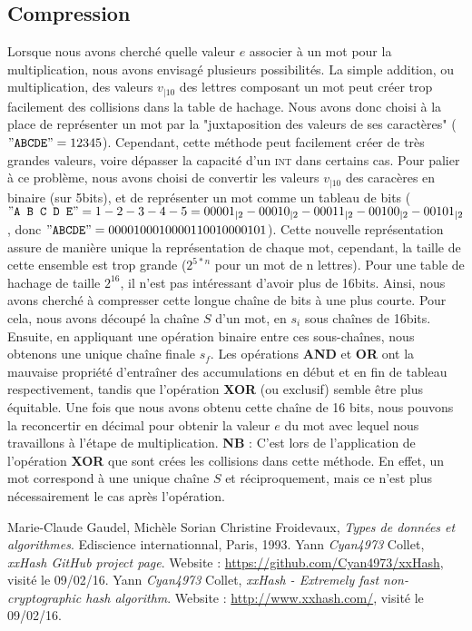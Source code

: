 \documentclass[final,twoside,article,10pt]{scrartcl}
\begin{document}
    \subsection{Compression}
    \label{sec:compression}
    Lorsque nous avons cherché quelle valeur $e$ associer à un mot pour la multiplication, nous avons envisagé plusieurs possibilités. La simple addition, ou multiplication, des valeurs $v_{|10}$ des lettres composant un mot peut créer trop facilement des collisions dans la table de hachage.
    Nous avons donc choisi à la place de représenter un mot par la "juxtaposition des valeurs de ses caractères" ($"\texttt{ABCDE}" = 12345$).
    Cependant, cette méthode peut facilement créer de très grandes valeurs, voire dépasser la capacité d'un \textsc{int} dans certains cas.
    Pour palier à ce problème, nous avons choisi de convertir les valeurs $v_{|10}$ des caracères en binaire (sur 5bits), et de représenter un mot comme un tableau de bits ($"\texttt{A B C D E}" = 1-2-3-4-5 = 00001_{|2}-00010_{|2}-00011_{|2}-00100_{|2}-00101_{|2}$, donc $"\texttt{ABCDE}" = 0000100010000110010000101$).
    Cette nouvelle représentation assure de manière unique la représentation de chaque mot, cependant, la taille de cette ensemble est trop grande ($2^{5*n}$ pour un mot de n lettres). 
    Pour une table de hachage de taille $2^{16}$, il n'est pas intéressant d'avoir plus de 16bits.
    Ainsi, nous avons cherché à compresser cette longue chaîne de bits à une plus courte.
    Pour cela, nous avons découpé la chaîne $S$ d'un mot, en $s_i$ sous chaînes de 16bits. Ensuite, en appliquant une opération binaire entre ces sous-chaînes, nous obtenons une unique chaîne finale $s_f$.
    Les opérations \textbf{AND} et \textbf{OR} ont la mauvaise propriété d'entraîner des accumulations en début et en fin de tableau respectivement, tandis que l'opération \textbf{XOR} (ou exclusif) semble être plus équitable.
    Une fois que nous avons obtenu cette chaîne de 16 bits, nous pouvons la reconcertir en décimal pour obtenir la valeur $e$ du mot avec lequel nous travaillons à l'étape de multiplication.\newline
    \medskip\newline
    \textbf{NB} : C'est lors de l'application de l'opération \textbf{XOR} que sont crées les collisions dans cette méthode. En effet, un mot correspond à une unique chaîne $S$ et réciproquement, mais ce n'est plus nécessairement le cas après l'opération.
    \begin{thebibliography}{9}
        Marie-Claude Gaudel, Michèle Sorian Christine Froidevaux, \emph{Types de données et algorithmes}. Ediscience internationnal, Paris, 1993.
        Yann \textit{Cyan4973} Collet, \emph{xxHash GitHub project page}. Website : \url{https://github.com/Cyan4973/xxHash}, visité le 09/02/16.
        Yann \textit{Cyan4973} Collet, \emph{xxHash - Extremely fast non-cryptographic hash algorithm}. Website : \url{http://www.xxhash.com/}, visité le 09/02/16.
\end{thebibliography}
\end{document}
